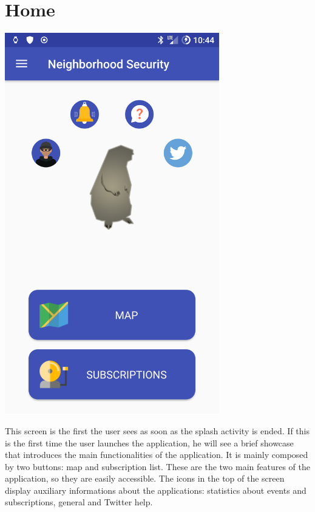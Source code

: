 \documentclass[a4paper]{scrreprt}
\begin{document}
\section{Home}
\begin{minipage}{0.5\textwidth}
	\centering
	\includegraphics[width=0.7\textwidth]{imgs/home}
\end{minipage}
\begin{minipage}{0.5\textwidth}
	This screen is the first the user sees as soon as the splash activity is ended. If this is the first time the user launches the application, he will see a brief showcase that introduces the main functionalities of the application. It is mainly composed by two buttons: map and subscription list. These are the two main features of the application, so they are easily accessible. The icons in the top of the screen display auxiliary informations about the applications: statistics about events and subscriptions, general and Twitter help.
\end{minipage}
\end{document}
